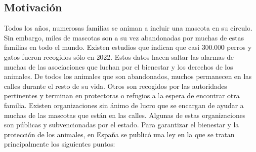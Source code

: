 \documentclass[a4paper, 12pt]{article}
\begin{document}
\subsection{Motivación}
Todos los años, numerosas familias se animan a incluir una mascota en su círculo. Sin embargo, miles de mascotas son a su vez abandonadas por muchas de estas familias en todo el mundo. Existen estudios \cite{affinity} que indican que casi 300.000 perros y gatos fueron recogidos sólo en 2022. Estos datos hacen saltar las alarmas de muchas de las asociaciones que luchan por el bienestar y los derechos de los animales. De todos los animales que son abandonados, muchos permanecen en las calles durante el resto de su vida. Otros son recogidos por las autoridades pertinentes y terminan en protectoras o refugios a la espera de encontrar otra familia. Existen organizaciones sin ánimo de lucro que se encargan de ayudar a muchas de las mascotas que están en las calles. Algunas de estas organizaciones son públicas y subvencionadas por el estado. Para garantizar el bienestar y la protección de los animales, en España se publicó una ley \cite{ley} en la que se tratan principalmente los siguientes puntos:
\end{document}

